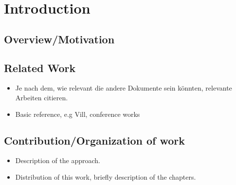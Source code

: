 \documentclass[
     12pt,         %
     a4paper,      %
     BCOR=10mm,     %
     DIV=14,        %
     ]{scrreprt}
\begin{document}
%
%
%
%
%
%


 



%


\chapter{Introduction}\label{Introduction}
\section{Overview/Motivation}
\section{Related Work}
\begin{itemize}
    \item Je nach dem, wie relevant die andere Dokumente sein könnten, relevante Arbeiten citieren. 
    \item Basic reference, e.g Vill, conference works
\end{itemize}
\section{Contribution/Organization of work}
\begin{itemize}
    \item Description of the approach.
    \item Distribution of this work, briefly description of the chapters.
\end{itemize}
\end{document}
